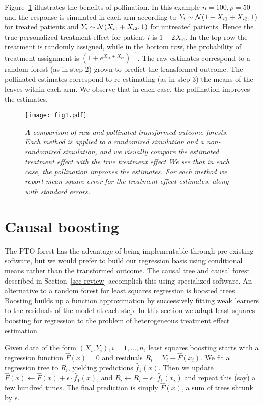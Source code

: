 \documentclass{article}
\begin{document}
Figure~\ref{fig-pollination} illustrates the benefits of pollination.
In this example $n = 100, p = 50$ and the response is simulated in each arm
according to $Y_i \sim \mathcal{N}(1 - X_{i1} + X_{i2}, 1)$ for treated patients and
$Y_i \sim \mathcal{N}(X_{i1} + X_{i2}, 1)$ for untreated patients. Hence the true
personalized treatment effect for patient $i$ is $1 + 2X_{i1}$.
In the top row the treatment is randomly assigned, while in the bottom row, the
probability of treatment assignment is $(1 + e^{X_{i1} + X_{i2}})^{-1}$.
The raw estimates correspond to a random forest (as in step 2) grown to predict
the transformed outcome. The pollinated estimates correspond to re-estimating
(as in step 3) the means of the leaves within each arm.
We observe that in each case, the pollination improves the estimates.

\begin{figure}[ht]
\centering
\caption{\it A comparison of raw and pollinated transformed outcome forests.
  Each method is applied to a randomized simulation and a non-randomized
  simulation, and we visually compare the estimated treatment effect with the
  true treatment effect We see that in each case, the pollination improves the
  estimates. For each method we report mean square error for the treatment
  effect estimates, along with standard errors.}
\label{fig-pollination}
\texttt{[image: fig1.pdf]}
\end{figure}




\section{Causal boosting}
\label{sec-causal-boosting}

The PTO forest has the advantage of being implementable through pre-existing
software, but we would prefer to build our regression basis using conditional
means rather than the transformed outcome. The causal tree and causal forest
described in Section~\ref{sec-review} accomplish this using specialized
software. An alternative to a random forest for least squares regression is
boosted trees. Boosting  builds up a function approximation by successively
fitting weak learners to the residuals of the model at each step.
In this section  we adapt least squares boosting for regression
\citep{Friedman01} to the problem  of heterogeneous treatment effect
estimation.

Given data  of the form
$(X_i, Y_i), i = 1, ..., n$, least squares boosting
starts with a regression function $\hat F(x) = 0$ and residuals
$R_i = Y_i - \hat F(x_i)$.
We fit a regression tree to $R_i$, yielding predictions $\hat f_1(x)$.
Then we update $\hat F(x) \leftarrow \hat F(x) + \epsilon \cdot \hat f_1(x)$,
and $R_i \leftarrow R_i - \epsilon \cdot \hat f_1(x_i)$ and repeat this (say) a
few hundred times. The final prediction is simply $\hat F(x)$, a sum of trees
shrunk by $\epsilon$.
\end{document}
